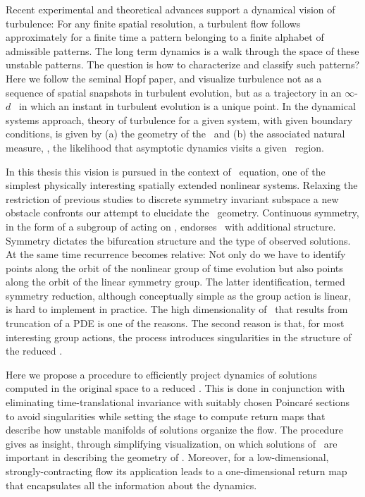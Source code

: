 

Recent experimental and theoretical advances
support a dynamical vision of turbulence:
For any finite  spatial resolution, a turbulent flow follows approximately for a finite time
a pattern belonging to a { finite alphabet} of admissible patterns.
The long term dynamics is a {walk through the space of these unstable patterns}.
The question is how to characterize and classify such patterns?
Here we follow the seminal Hopf paper, and  visualize
turbulence not as  a sequence of spatial snapshots in turbulent evolution,
but as a trajectory in an  $\infty$-$d$ \statesp\ in which an
instant in turbulent evolution is a {unique} point. In the dynamical systems approach,
theory of turbulence for a given system, with given boundary conditions,
is given by (a) the geometry of the \statesp\ and (b) the associated natural measure,
\ie, the likelihood that asymptotic dynamics visits a given \statesp\ region.

In this thesis this vision is pursued in the context of \KS\
equation, one of the simplest physically interesting spatially
extended nonlinear systems. Relaxing the restriction of
previous studies to discrete
symmetry invariant subspace a new obstacle confronts our
attempt to elucidate the \statesp\ geometry. Continuous
symmetry, in the form of a subgroup of  acting on
\statesp, endorses \statesp\ with additional structure.
Symmetry dictates the bifurcation structure and the type of
observed solutions. At the same time recurrence becomes
relative: Not only do we have to identify points along the
orbit of the nonlinear group of time evolution but also points
along the orbit of the linear symmetry group. The latter
identification, termed symmetry reduction, although
conceptually simple as the group action is linear, is hard to
implement in practice. The high dimensionality of \statesp\
that results from truncation of a PDE is one of the reasons.
The second reason is that, for most interesting group actions,
the process introduces singularities in the structure of the
reduced \statesp.

Here we propose a procedure to efficiently project dynamics of
solutions computed in the original space to a reduced \statesp.
This is done in conjunction with eliminating time-translational
invariance with suitably chosen Poincar\'e sections to avoid
singularities while setting the stage to compute return maps
that describe how unstable manifolds of solutions organize the
flow. The procedure gives as insight, through simplifying
visualization, on which solutions of \KSe\ are
important in describing the geometry of \statesp. Moreover,
for a low-dimensional, strongly-contracting flow its
application leads to a one-dimensional return map that
encapsulates all the information about the dynamics.

